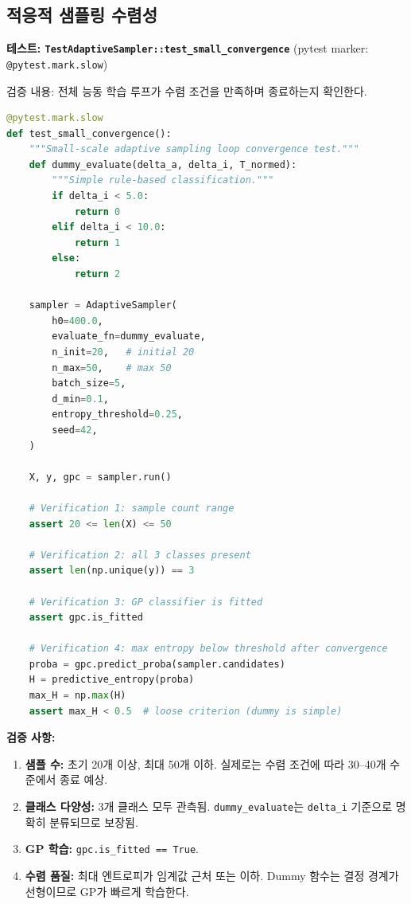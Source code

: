 \documentclass[11pt]{article}
\begin{document}
\subsection{적응적 샘플링 수렴성}

\textbf{테스트: \texttt{TestAdaptiveSampler::test\_small\_convergence}} (pytest marker: \texttt{@pytest.mark.slow})

검증 내용: 전체 능동 학습 루프가 수렴 조건을 만족하며 종료하는지 확인한다.

\begin{lstlisting}[language=Python]
@pytest.mark.slow
def test_small_convergence():
    """Small-scale adaptive sampling loop convergence test."""
    def dummy_evaluate(delta_a, delta_i, T_normed):
        """Simple rule-based classification."""
        if delta_i < 5.0:
            return 0
        elif delta_i < 10.0:
            return 1
        else:
            return 2

    sampler = AdaptiveSampler(
        h0=400.0,
        evaluate_fn=dummy_evaluate,
        n_init=20,   # initial 20
        n_max=50,    # max 50
        batch_size=5,
        d_min=0.1,
        entropy_threshold=0.25,
        seed=42,
    )

    X, y, gpc = sampler.run()

    # Verification 1: sample count range
    assert 20 <= len(X) <= 50

    # Verification 2: all 3 classes present
    assert len(np.unique(y)) == 3

    # Verification 3: GP classifier is fitted
    assert gpc.is_fitted

    # Verification 4: max entropy below threshold after convergence
    proba = gpc.predict_proba(sampler.candidates)
    H = predictive_entropy(proba)
    max_H = np.max(H)
    assert max_H < 0.5  # loose criterion (dummy is simple)
\end{lstlisting}

\textbf{검증 사항:}
\begin{enumerate}[label=\arabic*.]
  \item \textbf{샘플 수:} 초기 20개 이상, 최대 50개 이하. 실제로는 수렴 조건에 따라 30--40개 수준에서 종료 예상.
  \item \textbf{클래스 다양성:} 3개 클래스 모두 관측됨. \texttt{dummy\_evaluate}는 \texttt{delta\_i} 기준으로 명확히 분류되므로 보장됨.
  \item \textbf{GP 학습:} \texttt{gpc.is\_fitted == True}.
  \item \textbf{수렴 품질:} 최대 엔트로피가 임계값 근처 또는 이하. Dummy 함수는 결정 경계가 선형이므로 GP가 빠르게 학습한다.
\end{enumerate}
\end{document}
